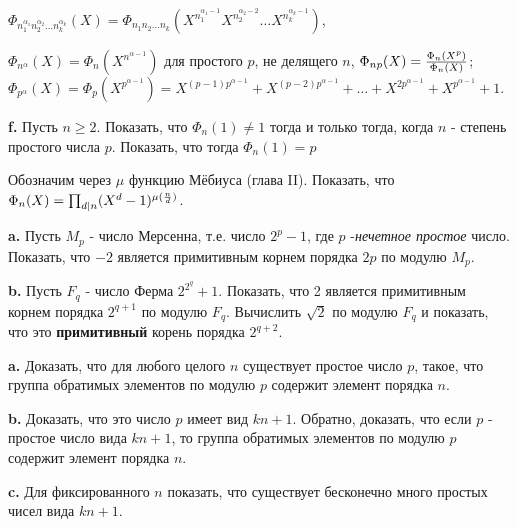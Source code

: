 \documentclass{mai_book}
\begin{document}
\begin{center}
$\Phi_{n_1^{\alpha_1}n_2^{\alpha_2} \ldots n_k^{\alpha_k}}(X)=\Phi_{n_1n_2 \ldots n_k}(X^{n_1^{\alpha_1-1}}X^{n_2^{\alpha_2-2}} \ldots X^{n_k^{\alpha_k-1}})$,
\end{center}
\newpage
$\Phi_{n^\alpha}(X)=\Phi_n(X^{n^{\alpha-1}})$ для простого $p$, не делящего $n$, $\Phi_{np}(X) = {{\Phi_n(X^p)} \over {\Phi_n(X)}}$;\\
$\Phi_{p^\alpha}(X)=\Phi_p(X^{p^{\alpha-1}})=X^{(p-1)p^{\alpha-1}}+X^{(p-2)p^{\alpha-1}}+\ldots+X^{2p^{\alpha-1}}+X^{p^{\alpha-1}}+1$.

\bigskip

{\bf f.} Пусть $n \geq 2$. Показать, что $\Phi_n(1) \neq 1$ тогда и только тогда, когда $n$ - степень простого числа $p$. Показать, что тогда $\Phi_n(1) = p$

\bigskip



\medskip

Обозначим через $\mu$ функцию Мёбиуса (глава II). Показать, что $\Phi_n(X)=\prod_{d|n}(X^d -1)^{\mu({n \over d})}$.

\medskip


\medskip

{\bf a.} Пусть $M_p$ - число Мерсенна, т.е. число $2^p-1$, где $p$ -\textit{нечетное простое} число. Показать, что $-2$ является примитивным корнем порядка $2p$ по модулю $M_p$.

{\bf b.} Пусть $F_q$ - число Ферма $2^{2^{q}}+1$. Показать, что 2 является примитивным корнем порядка $2^{q+1}$ по модулю $F_q$. Вычислить $\sqrt{2}$ по
модулю $F_q$ и показать, что это {\bf примитивный} корень порядка $2^{q+2}$.

\bigskip


\medskip

{\bf a.} Доказать, что для любого целого $n$ существует простое число $p$, такое, что группа обратимых элементов по модулю $p$ содержит элемент порядка $n$.

{\bf b.} Доказать, что это число $p$ имеет вид $kn+1$. Обратно, доказать, что если $p$ - простое число вида $kn+1$, то группа обратимых элементов по модулю $p$ содержит элемент порядка $n$.

{\bf c.} Для фиксированного $n$ показать, что существует бесконечно много простых чисел вида $kn+1$.
\end{document}
